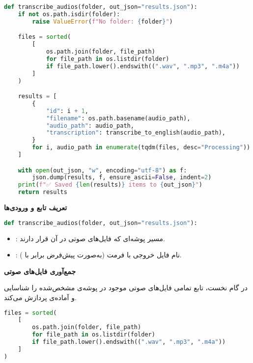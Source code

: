 \documentclass{article}
\begin{document}
\begin{latin}
\begin{lstlisting}[language=Python]
def transcribe_audios(folder, out_json="results.json"):
    if not os.path.isdir(folder):
        raise ValueError(f"No folder: {folder}")

    files = sorted(
        [
            os.path.join(folder, file_path)
            for file_path in os.listdir(folder)
            if file_path.lower().endswith((".wav", ".mp3", ".m4a"))
        ]
    )

    results = [
        {
            "id": i + 1,
            "filename": os.path.basename(audio_path),
            "audio_path": audio_path,
            "transcription": transcribe_to_english(audio_path),
        }
        for i, audio_path in enumerate(tqdm(files, desc="Processing"))
    ]

    with open(out_json, "w", encoding="utf-8") as f:
        json.dump(results, f, ensure_ascii=False, indent=2)
    print(f"✅ Saved {len(results)} items to {out_json}")
    return results
\end{lstlisting}
\end{latin}


\textbf{تعریف تابع و ورودی‌ها}

\begin{latin}
\begin{lstlisting}[language=Python]
def transcribe_audios(folder, out_json="results.json"):
\end{lstlisting}
\end{latin}

\begin{itemize}
    \item {}: مسیر پوشه‌ای که فایل‌های صوتی در آن قرار دارند.
    \item {}: نام فایل خروجی با فرمت  (به‌صورت پیش‌فرض برابر با ).
\end{itemize}

\textbf{جمع‌آوری فایل‌های صوتی}

در گام نخست، تابع تمامی فایل‌های صوتی موجود در پوشه‌ی مشخص‌شده را شناسایی و آماده‌ی پردازش می‌کند.

\begin{latin}
\begin{lstlisting}[language=Python]
files = sorted(
    [
        os.path.join(folder, file_path)
        for file_path in os.listdir(folder)
        if file_path.lower().endswith((".wav", ".mp3", ".m4a"))
    ]
)
\end{lstlisting}
\end{latin}
\end{document}
